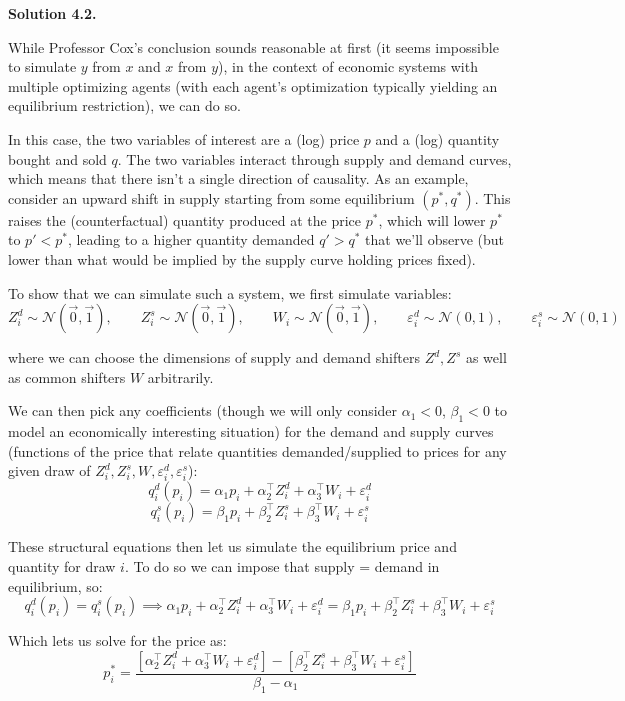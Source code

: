 \documentclass[11pt]{article}
\newenvironment{solution}[1]
    {\bigskip\noindent\textbf{Solution #1.} \par}
    {\medskip}
\begin{document}
\begin{solution}{4.2}

While Professor Cox's conclusion sounds reasonable at first (it seems impossible to simulate $y$ from $x$ and $x$ from $y$), in the context of economic systems with multiple optimizing agents (with each agent's optimization typically yielding an equilibrium restriction), we can do so.

In this case, the two variables of interest are a (log) price $p$ and a (log) quantity bought and sold $q$. The two variables interact through supply and demand curves, which means that there isn't a single direction of causality. As an example, consider an upward shift in supply starting from some equilibrium $(p^*,q^*)$. This raises the (counterfactual) quantity produced at the price $p^*$, which will lower $p^*$ to $p'<p^*$, leading to a higher quantity demanded $q'>q^*$ that we'll observe (but lower than what would be implied by the supply curve holding prices fixed).

To show that we can simulate such a system, we first simulate variables:
\[
Z^d_i \sim \mathcal{N}(\vec{0}, \vec{1}), \qquad Z^s_i \sim \mathcal{N}(\vec{0}, \vec{1}), \qquad W_i \sim \mathcal{N}(\vec{0}, \vec{1}), \qquad \varepsilon^d_i \sim \mathcal{N}(0,1), \qquad \varepsilon^s_i \sim \mathcal{N}(0,1)
\]

where we can choose the dimensions of supply and demand shifters $Z^d,Z^s$ as well as common shifters $W$ arbitrarily.

We can then pick any coefficients (though we will only consider $\alpha_1<0$, $\beta_1<0$ to model an economically interesting situation) for the demand and supply curves (functions of the price that relate quantities demanded/supplied to prices for any given draw of $Z_i^d,Z_i^s,W,\varepsilon_i^d,\varepsilon_i^s$):
\[
q^d_i(p_i) = \alpha_1 p_i + \alpha_2^\top Z_i^d + \alpha_3^\top W_i + \varepsilon^d_i
\]
\[
q^s_i(p_i) = \beta_1 p_i + \beta_2^\top Z_i^s + \beta_3^\top W_i + \varepsilon^s_i
\]

These structural equations then let us simulate the equilibrium price and quantity for draw $i$. To do so we can impose that supply = demand in equilibrium, so:
\[
q^d_i(p_i) = q^s_i(p_i) \implies \alpha_1 p_i + \alpha_2^\top Z_i^d + \alpha_3^\top W_i + \varepsilon^d_i = \beta_1 p_i + \beta_2^\top Z_i^s + \beta_3^\top W_i + \varepsilon^s_i
\]

Which lets us solve for the price as:
\[
p_i^* = \frac{\left[\alpha_2^\top Z_i^d + \alpha_3^\top W_i + \varepsilon^d_i \right] - \left[\beta_2^\top Z_i^s + \beta_3^\top W_i + \varepsilon^s_i \right] }{\beta_1-\alpha_1}
\]


\end{solution}
\end{document}
